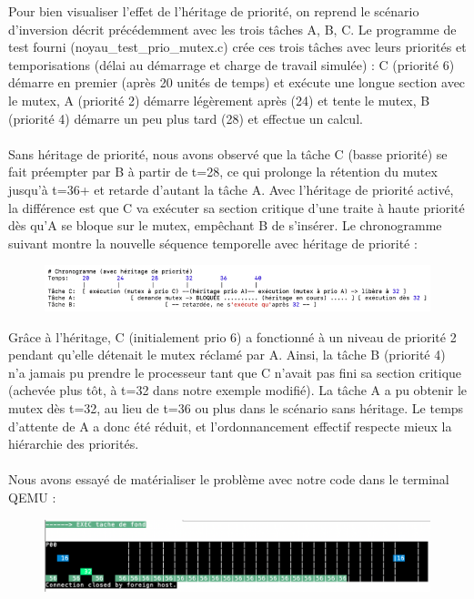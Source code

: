 \documentclass{latexPackage/utc-report/utc-report}
\begin{document}
Pour bien visualiser l’effet de l’héritage de priorité, on reprend le scénario d’inversion décrit précédemment avec les trois tâches A, B, C. Le programme de test fourni (noyau\_test\_prio\_mutex.c) crée ces trois tâches avec leurs priorités et temporisations (délai au démarrage et charge de travail simulée) : C (priorité 6) démarre en premier (après 20 unités de temps) et exécute une longue section avec le mutex, A (priorité 2) démarre légèrement après (24) et tente le mutex, B (priorité 4) démarre un peu plus tard (28) et effectue un calcul.
\\\\
Sans héritage de priorité, nous avons observé que la tâche C (basse priorité) se fait préempter par B à partir de t=28, ce qui prolonge la rétention du mutex jusqu’à t=36+ et retarde d’autant la tâche A. Avec l’héritage de priorité activé, la différence est que C va exécuter sa section critique d’une traite à haute priorité dès qu’A se bloque sur le mutex, empêchant B de s’insérer. Le chronogramme suivant montre la nouvelle séquence temporelle avec héritage de priorité :

\begin{figure}[H]
    \centering
    \includegraphics[width=15cm]{images/chrono2}
\end{figure}

Grâce à l’héritage, C (initialement prio 6) a fonctionné à un niveau de priorité 2 pendant qu’elle détenait le mutex réclamé par A. Ainsi, la tâche B (priorité 4) n’a jamais pu prendre le processeur tant que C n’avait pas fini sa section critique (achevée plus tôt, à t=32 dans notre exemple modifié). La tâche A a pu obtenir le mutex dès t=32, au lieu de t=36 ou plus dans le scénario sans héritage. Le temps d’attente de A a donc été réduit, et l’ordonnancement effectif respecte mieux la hiérarchie des priorités.
\\\\
Nous avons essayé de matérialiser le problème avec notre code dans le terminal QEMU :

\begin{figure}[H]
    \centering
    \includegraphics[width=15cm]{images/chrono3}
\end{figure}
\end{document}
